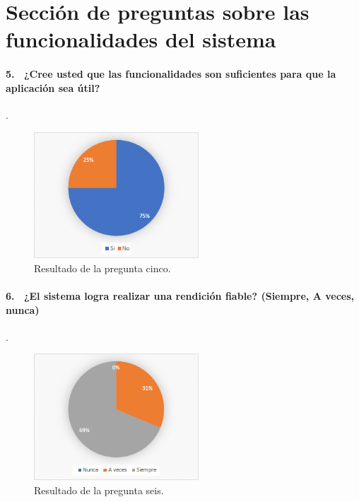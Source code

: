 \section{Sección de preguntas sobre las funcionalidades del sistema}

\paragraph{5.  ¿Cree usted que las funcionalidades son suficientes para que la aplicación sea útil?  }.

\begin{figure}[h!]
    \centering
    \includegraphics[width=0.55\textwidth]{Imagenes/Pregunta5.png}
    \caption{\label{fig: Pregunta5}Resultado de la pregunta cinco.}
\end{figure}

\paragraph{6.  ¿El sistema logra realizar una rendición fiable? (Siempre, A veces, nunca)}.

\begin{figure}[h!]
    \centering
    \includegraphics[width=0.55\textwidth]{Imagenes/Pregunta6.png}
    \caption{\label{fig: Pregunta6}Resultado de la pregunta seis.}
\end{figure}